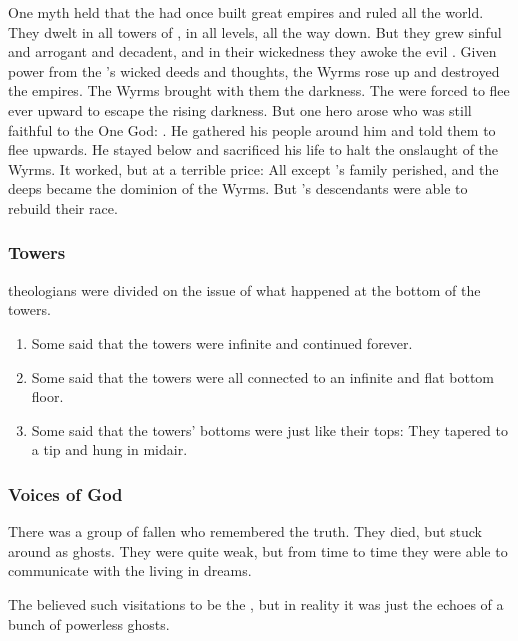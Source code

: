 One myth held that the \resphain had once built great empires and ruled all the world.
They dwelt in all towers of \Nyx, in all levels, all the way down. 
But they grew sinful and arrogant and decadent, and in their wickedness they awoke the evil . 
Given power from the \resphain's wicked deeds and thoughts, the Wyrms rose up and destroyed the \resphan empires. 
The Wyrms brought with them the darkness. 
The \resphain were forced to flee ever upward to escape the rising darkness.
But one hero arose who was still faithful to the One God: 
\Thanatzil. 
He gathered his people around him and told them to flee upwards.
He stayed below and sacrificed his life to halt the onslaught of the Wyrms. 
It worked, but at a terrible price:
All \resphain except \Thanatzil's family perished, and the deeps became the dominion of the Wyrms. 
But \Thanatzil's descendants were able to rebuild their race. 






\subsubsection{Towers}
\Merkyran theologians were divided on the issue of what happened at the bottom of the towers.
\begin{enumerate}
  \item 
    Some said that the towers were infinite and continued forever.
  \item
    Some said that the towers were all connected to an infinite and flat bottom floor.
  \item
    Some said that the towers' bottoms were just like their tops: 
    They tapered to a tip and hung in midair.
\end{enumerate}





\subsubsection{Voices of God}
There was a group of fallen \resphain{} who remembered the truth. 
They died, but stuck around as ghosts. 
They were quite weak, but from time to time they were able to communicate with the living \resphain{} in dreams. 

The \Merkyrans{} believed such visitations to be the , but in reality it was just the echoes of a bunch of powerless ghosts. 


